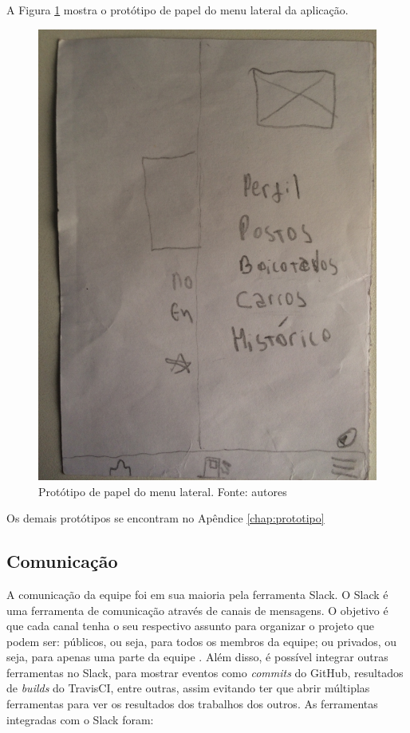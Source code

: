 A Figura \ref{img:prototipo_de_papel_menu_lateral} mostra o protótipo de papel do menu lateral da aplicação.
\begin{figure}[H]
    \centering
    \includegraphics[scale=0.1, angle=-90]{figuras/prototipo_papel_menu.jpg}
    \caption[Protótipo de papel do menu lateral]{Protótipo de papel do menu lateral. Fonte: autores}
    \label{img:prototipo_de_papel_menu_lateral}
\end{figure}
 \pagebreak

Os demais protótipos se encontram no Apêndice \ref{chap:prototipo}

\subsection{Comunicação}

A comunicação da equipe foi em sua maioria pela ferramenta Slack. O Slack é uma ferramenta de comunicação através de canais de mensagens. O objetivo é que cada canal tenha o seu respectivo assunto para organizar o projeto que podem ser: públicos, ou seja, para todos os membros da equipe; ou privados, ou seja, para apenas uma parte da equipe \cite{slack}. Além disso, é possível integrar outras ferramentas no Slack, para mostrar eventos como \textit{commits} do GitHub, resultados de \textit{builds} do TravisCI, entre outras, assim evitando ter que abrir múltiplas ferramentas para ver os resultados dos trabalhos dos outros. As ferramentas integradas com o Slack foram:

